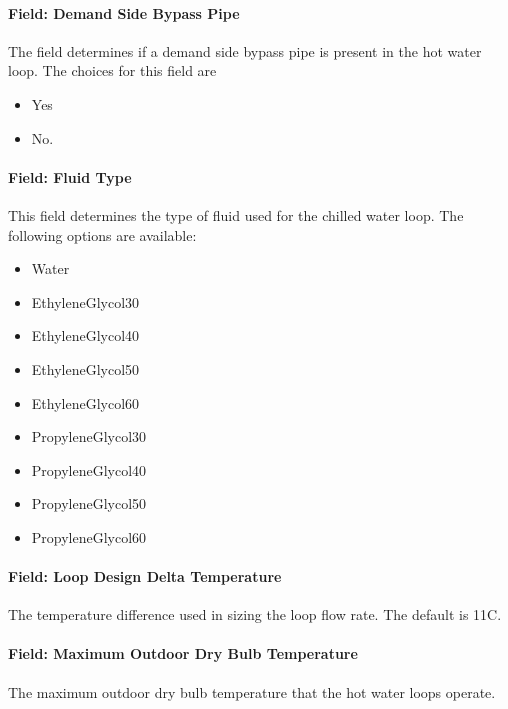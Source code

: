 \paragraph{Field: Demand Side Bypass Pipe}\label{field-demand-side-bypass-pipe}

The field determines if a demand side bypass pipe is present in the hot water loop. The choices for this field are

\begin{itemize}
\item
  Yes
\item
  No.
\end{itemize}

\paragraph{Field: Fluid Type}\label{field-fluid-type-1}

This field determines the type of fluid used for the chilled water loop. The following options are available:

\begin{itemize}
\item
  Water
\item
  EthyleneGlycol30
\item
  EthyleneGlycol40
\item
  EthyleneGlycol50
\item
  EthyleneGlycol60
\item
  PropyleneGlycol30
\item
  PropyleneGlycol40
\item
  PropyleneGlycol50
\item
  PropyleneGlycol60
\end{itemize}

\paragraph{Field: Loop Design Delta Temperature}\label{field-loop-design-delta-temperature-1}

The temperature difference used in sizing the loop flow rate. The default is 11C.

\paragraph{Field: Maximum Outdoor Dry Bulb Temperature}\label{field-maximum-outdoor-dry-bulb-temperature}

The maximum outdoor dry bulb temperature that the hot water loops operate.

